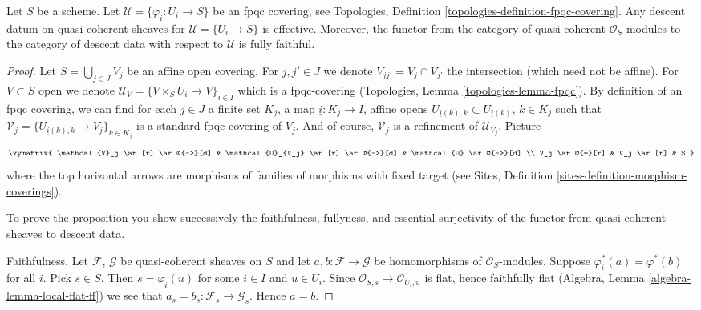 \begin{proposition}
\label{proposition-fpqc-descent-quasi-coherent}
Let $S$ be a scheme.
Let $\mathcal{U} = \{\varphi_i : U_i \to S\}$ be an fpqc covering, see
Topologies, Definition \ref{topologies-definition-fpqc-covering}.
Any descent datum on quasi-coherent sheaves
for $\mathcal{U} = \{U_i \to S\}$ is effective.
Moreover, the functor from the category of
quasi-coherent $\mathcal{O}_S$-modules to the category
of descent data with respect to $\mathcal{U}$ is fully faithful.
\end{proposition}

\begin{proof}
Let $S = \bigcup_{j \in J} V_j$ be an affine open covering.
For $j, j' \in J$ we denote $V_{jj'} = V_j \cap V_{j'}$ the intersection
(which need not be affine). For $V \subset S$ open we denote
$\mathcal{U}_V = \{V \times_S U_i \to V\}_{i \in I}$ which is a
fpqc-covering (Topologies, Lemma \ref{topologies-lemma-fpqc}).
By definition of an fpqc covering, we can find for each $j \in J$ a
finite set $K_j$, a map $\underline{i} : K_j \to I$,
affine opens $U_{\underline{i}(k), k} \subset U_{\underline{i}(k)}$,
$k \in K_j$ such that
$\mathcal{V}_j = \{U_{\underline{i}(k), k} \to V_j\}_{k \in K_j}$ is
a standard fpqc covering of $V_j$. And of course, $\mathcal{V}_j$
is a refinement of $\mathcal{U}_{V_j}$. Picture
$$
\xymatrix{
\mathcal{V}_j \ar[r] \ar@{~>}[d] &
\mathcal{U}_{V_j} \ar[r] \ar@{~>}[d] &
\mathcal{U} \ar@{~>}[d] \\
V_j \ar@{=}[r] & V_j \ar[r] & S
}
$$
where the top horizontal arrows are morphisms of families of
morphisms with fixed target (see
Sites, Definition \ref{sites-definition-morphism-coverings}).

\medskip\noindent
To prove the proposition you show successively the
faithfulness, fullyness, and essential surjectivity of the
functor from quasi-coherent sheaves to descent data.

\medskip\noindent
Faithfulness. Let $\mathcal{F}$, $\mathcal{G}$ be quasi-coherent
sheaves on $S$ and let $a, b : \mathcal{F} \to \mathcal{G}$ be
homomorphisms of $\mathcal{O}_S$-modules.
Suppose $\varphi_i^*(a) = \varphi^*(b)$ for all $i$.
Pick $s \in S$. Then $s = \varphi_i(u)$ for some $i \in I$ and
$u \in U_i$. Since $\mathcal{O}_{S, s} \to \mathcal{O}_{U_i, u}$
is flat, hence faithfully flat
(Algebra, Lemma \ref{algebra-lemma-local-flat-ff}) we see
that $a_s = b_s : \mathcal{F}_s \to \mathcal{G}_s$. Hence $a = b$.


\end{proof}

